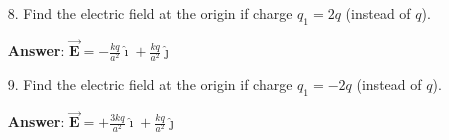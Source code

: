 \documentclass{article}
\newcommand{\ds}[0]{\displaystyle}
\newcommand{\ihat}[0]{\hat{\boldsymbol{\imath}}}
\newcommand{\jhat}[0]{\hat{\boldsymbol{\jmath}}}
\newcommand{\bfvec}[1]{\vec{\mathbf{#1}}}
\begin{document}
\begin{enumerate}
            \vskip 72pt
            \fi
            \ifsolutions\else
            \vskip 72pt
            \fi

  \item[8.] Find the electric field at the origin if charge $q_1=2q$ (instead of $q$).

            \ifsolutions
            {\bf Answer}: $\ds\bfvec{E}=-\frac{kq}{a^2}\ihat+\frac{kq}{a^2}\jhat$
            \else

            \vskip 72pt
            \fi
            \ifsolutions\else
            \vskip 72pt
            \fi

  \item[9.] Find the electric field at the origin if charge $q_1=-2q$ (instead of $q$).

            \ifsolutions
            {\bf Answer}: $\ds\bfvec{E}=+\frac{3kq}{a^2}\ihat+\frac{kq}{a^2}\jhat$
            \else

            \vskip 72pt
            \fi
            \ifsolutions\else
            \vskip 72pt
            \fi

\end{enumerate}
\end{document}
